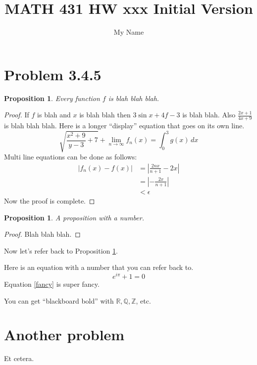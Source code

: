 \documentclass[11pt]{article}
\theoremstyle{plain} %
\newtheorem{proposition}[theorem]{Proposition}
\newtheorem*{proposition*}{Proposition}
\theoremstyle{definition} %
\theoremstyle{remark} %
\begin{document}
\title{MATH 431 HW xxx Initial Version}
\author{My Name}
\maketitle


\section{Problem 3.4.5}

\begin{proposition*}
  Every function $f$ is blah blah blah.
\end{proposition*}

\begin{proof}
  If $f$ is blah and $x$ is blah blah then $3 \sin x + 4 f - 3$ is
  blah blah.  Also $\frac{2x+1}{4x+9}$ is blah blah blah.
  Here is a longer ``display'' equation that goes on its own line.
  \begin{equation*}
    \sqrt{\frac{x^2+9}{y-3}+7} +
    \lim_{n \to \infty} f_n(x) = \int_0^3 g(x)\,dx
  \end{equation*}
  Multi line equations can be done as follows:
  \begin{align*}
    |f_n(x) - f(x)| &= \left| \frac{2nx}{n+1} - 2x \right| \\
    &= \left| -\frac{2x}{n+1} \right| \\
    &< \epsilon
  \end{align*}
  Now the proof is complete.
\end{proof}

\begin{proposition}\label{coolprop}
  A proposition with a number.
\end{proposition}

\begin{proof}
  Blah blah blah.
\end{proof}

Now let's refer back to Proposition \ref{coolprop}.

Here is an equation with a number that you can refer back to.
\begin{equation}\label{fancy}
  e^{i \pi} + 1 = 0
\end{equation}
Equation \eqref{fancy} is super fancy.

You can get ``blackboard bold'' with $\mathbb{R}, \mathbb{Q},
\mathbb{Z}$, etc.

\section{Another problem}

Et cetera.
\end{document}
